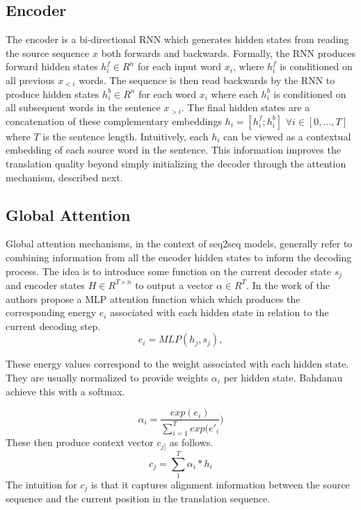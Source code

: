 \subsection{Encoder}
The encoder is a bi-directional \ac{RNN} which generates hidden states from reading the source sequence $x$ both forwards and backwards. Formally, the \ac{RNN} produces forward hidden states $h^{f}_{i} \in R^{n}$ for each input word $x_{i}$, where $h^{f}_{i}$ is conditioned on all previous $x_{<i}$ words. The sequence is then read backwards by the \ac{RNN} to produce hidden states $h^{b}_{i} \in R^{n}$ for each word $x_{i}$ where each $h^{b}_{i}$ is conditioned on all subsequent words in the sentence $x_{>i}$. The final hidden states are a concatenation of these complementary embeddings $h_{i}  = [h^{f}_{i} ; h^{b}_{i}]$ $ \forall i \in [0,...,T]$ where $T$ is the sentence length. Intuitively, each $h_{i}$ can be viewed as a contextual embedding of each source word in the sentence. This information improves the translation quality beyond simply initializing the decoder through the attention mechanism, described next. 

\subsection{Global Attention}

Global attention mechanisms, in the context of \ac{seq2seq} models, generally refer to combining information from all the encoder hidden states to inform the decoding process. The idea is to introduce some function on the current decoder state $s_{j}$ and encoder states $H \in R^{T \times n}$ to output a vector $\alpha \in R^{T}$. In the work of \citet{bahdanau2014NMTBYJoint} the authors propose a \ac{MLP} attention function which which produces the corresponding energy $e_{i}$ associated with each hidden state in relation to the current decoding step.
\begin{equation}
e_{i} = MLP(h_{j}, s_{j}),
\end{equation}


These energy values correspond to the weight associated with each hidden state. They are usually normalized to provide weights $\alpha_{i}$ per hidden state. Bahdanau achieve this with a softmax. 

\begin{equation}
	\alpha_{i} = \frac{exp(e_{i})}{\sum_{i=1}^{T} exp(e'_{i}})
\end{equation}
These then produce context vector $c_{j]}$ as follows. 
\begin{equation}
c_{j} = \sum_{1}^{T} \alpha_{i} * h_{i}
\end{equation}
The intuition for $c_{j}$ is that it captures alignment information between the source sequence and the current position in the translation sequence. %

